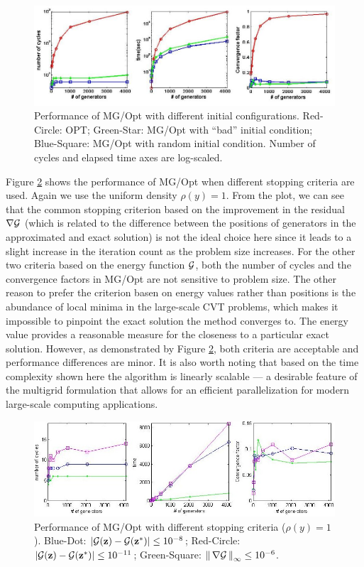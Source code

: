 \documentclass{siamltex}
\begin{document}
\begin{figure}[h]
\centering
  \includegraphics[width=1.0\textwidth]{uniopt_mg_bad_ini1}
  \caption{Performance of MG/Opt with different initial configurations. Red-Circle: OPT; Green-Star: MG/Opt with ``bad'' initial condition; Blue-Square: MG/Opt with random initial condition. Number of cycles and elapsed time axes are log-scaled.}
\label{fig:bad}
\end{figure}


Figure \ref{fig:g_difstop} shows the performance of MG/Opt when different stopping criteria are used.  Again we use the uniform density $\rho(y) = 1$.  From the plot, we can see that the common stopping criterion based on the improvement in the residual  $\nabla \cg$ (which is related to the difference between the positions of generators in the approximated and exact solution) is not the ideal choice here since it leads to a slight increase in the iteration count as the problem size increases.  For the other two criteria based on the energy function $\cg$, both the number of cycles and the convergence factors in MG/Opt are not sensitive to problem size. The other reason to prefer the criterion basen on energy values rather than positions is the abundance of local minima in the large-scale CVT problems, which makes it impossible to pinpoint the exact solution the method converges to. The energy value provides a reasonable measure for the closeness to a particular exact solution. However, as demonstrated by Figure \ref{fig:g_difstop}, both criteria are acceptable and performance differences are minor.
It is also worth noting that based on the time complexity shown here the algorithm is linearly scalable --- a desirable feature %
of the multigrid formulation that allows for an efficient parallelization for modern large-scale computing applications.

\begin{figure}[h]
\centering
  \includegraphics[width=1.0\textwidth]{uni_diffstop}
  \caption{Performance of MG/Opt with different stopping criteria ($\rho(y) = 1$).
    Blue-Dot: $|\cg(\bz)-\cg(\bz^{*})| \le 10^{-8}$; Red-Circle: $|\cg(\bz)-\cg(\bz^{*})| \le 10^{-11}$;
    Green-Square: $\norm{\nabla \cg}_\infty \le 10^{-6}$.}
\label{fig:g_difstop}
\end{figure}
\end{document}
